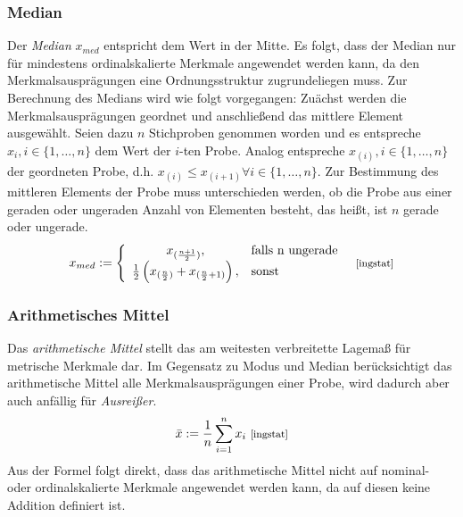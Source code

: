 \documentclass[fontsize=11pt]{scrartcl}
\begin{document}
                        \subsubsection{Median}
                        Der \emph{Median} $x_{med}$ entspricht dem Wert in der Mitte. Es folgt, dass der Median nur für mindestens ordinalskalierte Merkmale angewendet werden kann, da den Merkmalsausprägungen eine Ordnungsstruktur zugrundeliegen muss.\cite{kohn2005}
                        \newline
                        Zur Berechnung des Medians wird wie folgt vorgegangen: Zuächst werden die Merkmalsausprägungen geordnet und anschließend das mittlere Element ausgewählt. Seien dazu $n$ Stichproben genommen worden und es entspreche $x_i,i \in \{1,\dots,n\}$ dem Wert der $i$-ten Probe. Analog entspreche $x_{(i)}, i \in \{1,\dots,n\}$ der geordneten Probe, d.h. $x_{(i)} \leq x_{(i+1)} \forall i \in \{1,\dots,n\}$.
                        \newline
                        Zur Bestimmung des mittleren Elements der Probe muss unterschieden werden, ob die Probe aus einer geraden oder ungeraden Anzahl von Elementen besteht, das heißt, ist $n$ gerade oder ungerade.
                        \newline
                        $$
                            x_{med}:=\left\{\begin{array}{cl} x_{(\frac{n+1}{2})}, & \mbox{falls n ungerade }\\ \frac{1}{2}\left( x_{(\frac{n}{2})} + x_{(\frac{n}{2}+1)} \right), & \mbox{sonst} \end{array}\right. \text{ \footnotesize\cite[S.12]{ingstat}}
                        $$
                    
                        \subsubsection{Arithmetisches Mittel}
                        Das \emph{arithmetische Mittel} stellt das am weitesten verbreitette Lagemaß für metrische Merkmale dar. Im Gegensatz zu Modus und Median berücksichtigt das arithmetische Mittel alle Merkmalsausprägungen einer Probe, wird dadurch aber auch anfällig für \emph{Ausreißer}.
                        $$ 
                            \bar{x} := \frac{1}{n}\sum_{i=1}^nx_i \text{ \footnotesize\cite[S.11]{ingstat}}
                        $$
                        Aus der Formel folgt direkt, dass das arithmetische Mittel nicht auf nominal- oder ordinalskalierte Merkmale angewendet werden kann, da auf diesen keine Addition definiert ist.
\end{document}
